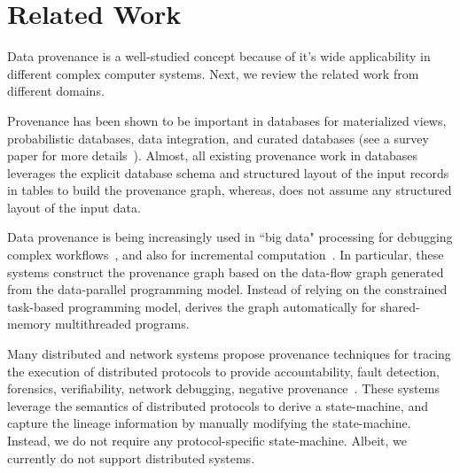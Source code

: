 \section{Related Work}
\label{sec:related}







Data provenance is a well-studied concept because of it's wide applicability in different complex computer systems. Next, we review the related work from different domains.






 Provenance has been shown to be important in databases for materialized views, probabilistic databases, data integration, and curated databases (see a survey paper for more details~\cite{provenance-database-tutorial}). Almost, all existing provenance work in databases leverages the explicit database schema and structured layout of the input records in tables to build the provenance graph, whereas, \projecttitle does not assume any structured layout of the input data.

 
 Data provenance is being increasingly used in ``big data"  processing for  debugging complex workflows~\cite{nova, conductor-nsdi-2012, conductor-ladis-2010, conductor-podc-2010}, and also for incremental computation~\cite{incoop, slider, incoop-hotcloud, incApprox, contraction-tree, shredder, Bhatotia15}.  %
In particular, these systems construct the provenance graph based on the data-flow graph generated from the data-parallel programming model. 
Instead of relying on the constrained task-based programming model,  \projecttitle derives the graph automatically for shared-memory multithreaded programs.


 Many distributed and network systems propose provenance techniques for tracing the  execution of distributed protocols to provide accountability, fault detection, forensics, verifiability, network debugging, negative provenance~\cite{ wu-2014-negative-provenance, snp, dtap}. %
These systems leverage the semantics of distributed protocols to derive a state-machine, and capture the lineage information by manually modifying the state-machine. Instead, we do not require any protocol-specific state-machine. Albeit, we currently do not support distributed systems.

